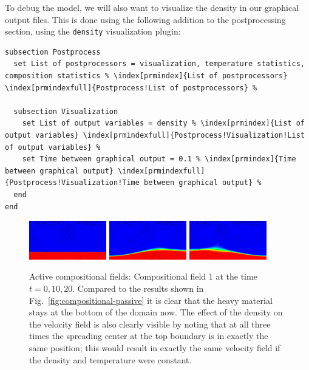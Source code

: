 \documentclass{article}
\begin{document}
To debug the model, we will also want to visualize the density in our
graphical output files. This is done using the following addition to the
postprocessing section, using the \texttt{density} visualization plugin:

\begin{lstlisting}[frame=single,language=prmfile,escapechar=\%]
subsection Postprocess
  set List of postprocessors = visualization, temperature statistics, composition statistics % \index[prmindex]{List of postprocessors} \index[prmindexfull]{Postprocess!List of postprocessors} %

  subsection Visualization
    set List of output variables = density % \index[prmindex]{List of output variables} \index[prmindexfull]{Postprocess!Visualization!List of output variables} %
    set Time between graphical output = 0.1 % \index[prmindex]{Time between graphical output} \index[prmindexfull]{Postprocess!Visualization!Time between graphical output} %
  end
end
\end{lstlisting}

\begin{figure}
  \centering
  \centering
  \includegraphics[width=0.3\textwidth]{cookbooks/composition-active/visit0007.png}
  \hfill
  \includegraphics[width=0.3\textwidth]{cookbooks/composition-active/visit0009.png}
  \hfill
  \includegraphics[width=0.3\textwidth]{cookbooks/composition-active/visit0008.png}
  \caption{Active compositional fields: Compositional field 1 at the time
    $t=0, 10, 20$. Compared to the results shown in
    Fig.~\ref{fig:compositional-passive} it is clear that the heavy material
    stays at the bottom of the domain now. The effect of the density on the
    velocity field is also clearly visible by noting that at all three times
    the spreading center at the top boundary is in exactly the same position;
    this would result in exactly the same velocity field if the density and
    temperature were constant.}
  \label{fig:composition-active-composition}
\end{figure}
\end{document}
